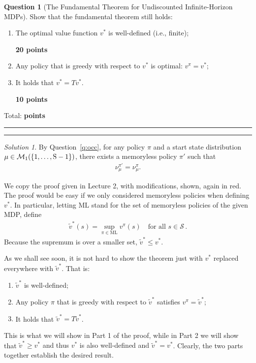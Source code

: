 \documentclass{article}
\DeclareMathOperator*{\1}{\mathbbm{1}}
\newcounter{DocPoints} %
\newcounter{QuestionPoints} %
\newcommand{\points}[1]{%
	\par\mbox{}\par\noindent\hfill {\bf #1 points}%
	\addtocounter{DocPoints}{#1}
	\addtocounter{QuestionPoints}{#1}
}
\newcommand{\tpoints}[1]{        %
	\ifthenelse{\isempty{#1}}%
	{%
	}%
	{%
		\addtocounter{DocPoints}{#1}
		\addtocounter{QuestionPoints}{#1}
	}													 %
	\par\mbox{}\par\noindent\hfill {Total: \bf \arabic{QuestionPoints}\xspace points}\par\mbox{}\par\hrule\hrule
	\setcounter{QuestionPoints}{0}
}
\theoremstyle{definition}
\newtheorem{question}{Question}
\theoremstyle{remark}
\newtheorem*{solution*}{Solution}
\begin{document}
\begin{question}[The Fundamental Theorem for Undiscounted Infinite-Horizon MDPs]
Show that  the fundamental theorem still holds:
\begin{enumerate}
\item The optimal value function $v^*$ is well-defined (i.e., finite);
\points{20}
\item Any policy  that is greedy with respect to $v^*$  is optimal: $v^\pi = v^*$;
\item It holds that $v^* = Tv^*$.
\points{10}
\end{enumerate}
\tpoints{}
\end{question}
\begin{solution*}
By Question~\ref{q:occ},
for any policy $\pi$ and a start state distribution $\mu \in \mathcal{M}_1(\{1,\dots,\mathrm{S}-1\})$, there exists a memoryless policy $\pi'$ such that
\begin{align*}
\nu_\mu^{\pi'} = \nu_\mu^{\pi}.
\end{align*}

We copy the proof given in Lecture 2, with modifications, shown, again in {\color{red} red}.
The proof would be easy if we only considered memoryless policies when defining $v^*$. 
In particular, letting $\text{ML}$ stand for the set of memoryless policies of the given MDP, define
\begin{align*}
\tilde{v}^*(s) = \sup_{\pi \in \text{ML}} v^\pi(s) \quad \text{for all } s \in \mathcal{S}\,.
\end{align*}
{\color{red} Because the supremum is over a smaller set, $\tilde{v}^* \le v^*$.}

As we shall see soon, it is not hard to show the theorem just with $v^*$ replaced everywhere with $\tilde{v}^*$.
That is:
\begin{enumerate}
\item {\color{red} $\tilde{v}^*$ is well-defined;}
\item Any policy $\pi$ that is greedy with respect to $\tilde{v}^*$ satisfies $v^\pi = \tilde{v}^*$;
\item It holds that $\tilde{v}^* = T \tilde{v}^*$.
\end{enumerate}

This is what we will show in Part 1 of the proof, while in Part 2 we will show that 
{\color{red} $\tilde{v}^* \ge v^*$ and thus $v^*$ is also well-defined and}
$\tilde{v}^*=v^*$.
Clearly, the two parts together establish the desired result.


\end{solution*}
\end{document}
